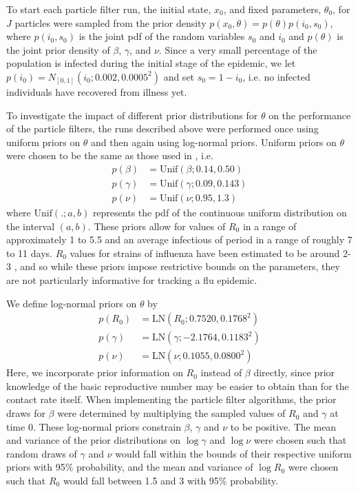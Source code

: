 \documentclass{elsarticle}
\begin{document}
To start each particle filter run, the initial state, $x_0$, and fixed parameters, $\theta_0$, for $J$ particles were sampled from the prior density $p(x_0,\theta) = p(\theta)p(i_0,s_0)$, where $p(i_0,s_0)$ is the joint pdf of the random variables $s_0$ and $i_0$ and $p(\theta)$ is the joint prior density of $\beta$, $\gamma$, and $\nu$. Since a very small percentage of the population is infected during the initial stage of the epidemic, we let $p(i_0) = N_{[0,1]}(i_0;0.002,0.0005^2)$ and set $s_0 = 1 - i_0$, i.e. no infected individuals have recovered from illness yet.

To investigate the impact of different prior distributions for $\theta$ on the performance of the particle filters, the runs described above were performed once using uniform priors on $\theta$ and then again using log-normal priors. Uniform priors on $\theta$ were chosen to be the same as those used in \citet{skvortsov2012monitoring}, i.e.
\begin{align*}
p(\beta) &= \mbox{Unif}(\beta; 0.14, 0.50) \\
p(\gamma) &= \mbox{Unif}(\gamma; 0.09, 0.143) \\
p(\nu) &= \mbox{Unif}(\nu; 0.95, 1.3)
\end{align*}%
where $\mbox{Unif}(.; a, b)$ represents the pdf of the continuous uniform distribution on the interval $(a,b)$. These priors allow for values of $R_0$ in a range of approximately 1 to 5.5 and an average infectious of period in a range of roughly 7 to 11 days. $R_0$ values for strains of influenza have been estimated to be around 2-3 \citep{mills2004influenza, heff2005repratio, zhang2011flu}, and so while these priors impose restrictive bounds on the parameters, they are not particularly informative for tracking a flu epidemic.

We define log-normal priors on $\theta$ by
\begin{align*}
p(R_0) &= \mbox{LN}(R_0; 0.7520, 0.1768^2) \\
p(\gamma) &= \mbox{LN}(\gamma; -2.1764, 0.1183^2) \\
p(\nu) &= \mbox{LN}(\nu; 0.1055, 0.0800^2)
\end{align*}
\noindent Here, we incorporate prior information on $R_0$ instead of $\beta$ directly, since prior knowledge of the basic reproductive number may be easier to obtain than for the contact rate itself. When implementing the particle filter algorithms, the prior draws for $\beta$ were determined by multiplying the sampled values of $R_0$ and $\gamma$ at time 0. These log-normal priors constrain $\beta$, $\gamma$ and $\nu$ to be positive. The mean and variance of the prior distributions on $\log \gamma$ and $\log \nu$ were chosen such that random draws of $\gamma$ and $\nu$ would fall within the bounds of their respective uniform priors with 95\% probability, and the mean and variance of $\log R_0$ were chosen such that $R_0$ would fall between 1.5 and 3 with 95\% probability.
\end{document}
